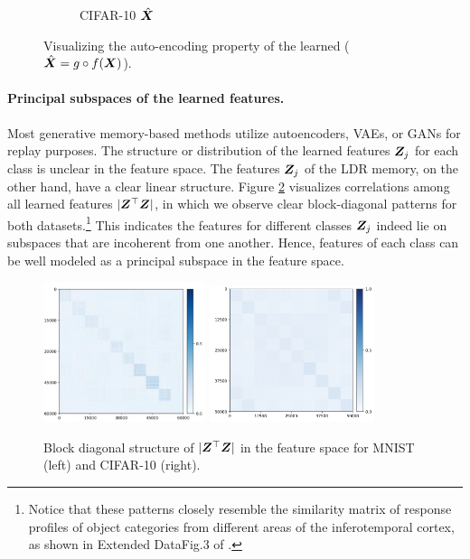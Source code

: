 \documentclass[../../book-main.tex]{subfiles}
\begin{document}
\begin{figure}[t]
\begin{subfigure}[t]{0.20\textwidth}
        \caption{CIFAR-10 $\hat{\bm{X}}$}
    \end{subfigure}
    \caption{\small Visualizing the auto-encoding property of the learned  ($\hat{\bm{X}} = g\circ f(\bm{X})$). }
        \label{fig:justifyxhatequalsx_incremental}
\end{figure}


\paragraph{Principal subspaces of the learned features.}
Most generative memory-based methods utilize autoencoders, VAEs, or GANs for replay purposes. The structure or distribution of the learned features $\bm{Z}_j$ for each class is  unclear in the feature space. The features $\bm{Z}_j$ of the LDR memory, on the other hand, have a clear linear structure. Figure \ref{fig:cifar_10_pca_sampling_main} visualizes correlations among all learned features $|\bm{Z}^\top\bm{Z}|$, in which we observe clear block-diagonal patterns for both datasets.\footnote{Notice that these patterns closely resemble the similarity matrix of response profiles of object categories from different areas of the inferotemporal cortex, as shown in  Extended DataFig.3 of \cite{Bao2020AMO}.} This indicates the features for different classes $\bm{Z}_j$ indeed lie on subspaces that are incoherent from one another. Hence, features of each class can be well modeled as a principal subspace in the feature space. %

\begin{figure}[tb]
\centering
\includegraphics[height=4.1cm]{chapters/chapter5/figs/Heatmap_MNIST.jpg}  \includegraphics[height=4cm]{chapters/chapter5/figs/Heatmap_CIFAR10.png}
\caption{\small Block diagonal structure of $|\bm{Z}^\top \bm{Z}|$ in the feature space for MNIST (left) and CIFAR-10 (right).}
\label{fig:cifar_10_pca_sampling_main}
\end{figure}
\end{document}
